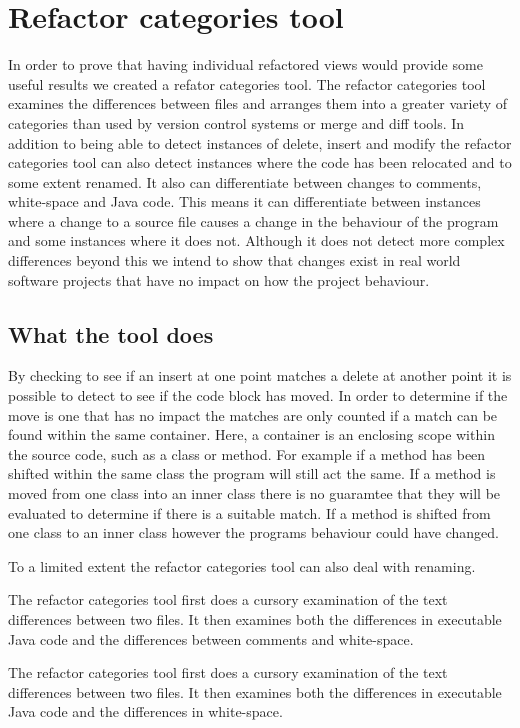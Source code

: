 
\chapter{Refactor categories tool}
In order to prove that having individual refactored views would provide some useful results we created a refator categories tool. The refactor categories tool examines the differences between files and arranges them into a greater variety of categories than used by version control systems or merge and diff tools.  In addition to being able to detect instances of delete, insert and modify the refactor categories tool can also detect instances where the code has been relocated and to some extent renamed.  It also can differentiate between changes to comments, white-space and Java code. This means it can differentiate between instances where a change to a source file causes a change in the behaviour of the program and some instances where it does not. Although it does not detect more complex differences beyond this we intend to show that changes exist in real world software projects that have no impact on how the project behaviour.

\section{What the tool does}

By checking to see if an insert at one point matches a delete at another point it is possible to detect to see if the code block has moved. In order to determine if the move is one that has no impact the matches are only counted if a match can be found within the same container.  Here, a container is an enclosing scope within the source code, such as a class or method. For example if a method has been shifted within the same class the program will still act the same.  If a method is moved from one class into an inner class there is no guaramtee that they will be evaluated to determine if there is a suitable match.  If a method is shifted from one class to an inner class however the programs behaviour could have changed.

To a limited extent the refactor categories tool can also deal with renaming.

The refactor categories tool first does a cursory examination of the text differences between two files. It then examines both the differences in executable Java code and the differences between comments and white-space. 

The refactor categories tool first does a cursory examination of the text differences between two files. It then examines both the differences in executable Java code and the differences in white-space.


